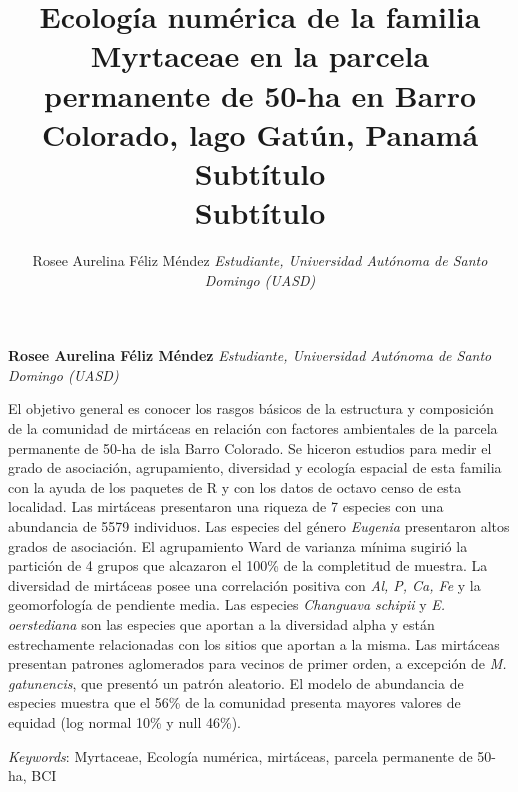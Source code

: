 \documentclass[11pt,]{article}
\title{Ecología numérica de la familia Myrtaceae en la parcela permanente de
50-ha en Barro Colorado, lago Gatún, Panamá\\
Subtítulo\\
Subtítulo  }
\author{\Large Rosee Aurelina Féliz Méndez\vspace{0.05in} \newline\normalsize\emph{Estudiante, Universidad Autónoma de Santo Domingo (UASD)}  }
\date{}
\newcommand*{\authorfont}{\fontfamily{phv}\selectfont}
\renewenvironment{abstract}
 {{%
    \setlength{\leftmargin}{0mm}
    \setlength{\rightmargin}{\leftmargin}%
  }%
  \relax}
 {\endlist}
\begin{document}
	
%

{%
\setlength{\parindent}{0pt}
\thispagestyle{plain}
{\fontsize{18}{20}\selectfont\raggedright 
\maketitle  %

}

{
   \vskip 13.5pt\relax \normalsize\fontsize{11}{12} 
\textbf{\authorfont Rosee Aurelina Féliz Méndez} \hskip 15pt \emph{\small Estudiante, Universidad Autónoma de Santo Domingo (UASD)}   

}

}








\begin{abstract}

    \hbox{\vrule height .2pt width 39.14pc}

    \vskip 8.5pt %

\noindent El objetivo general es conocer los rasgos básicos de la estructura y
composición de la comunidad de mirtáceas en relación con factores
ambientales de la parcela permanente de 50-ha de isla Barro Colorado. Se
hiceron estudios para medir el grado de asociación, agrupamiento,
diversidad y ecología espacial de esta familia con la ayuda de los
paquetes de R y con los datos de octavo censo de esta localidad. Las
mirtáceas presentaron una riqueza de 7 especies con una abundancia de
5579 individuos. Las especies del género \emph{Eugenia} presentaron
altos grados de asociación. El agrupamiento Ward de varianza mínima
sugirió la partición de 4 grupos que alcazaron el 100\% de la
completitud de muestra. La diversidad de mirtáceas posee una correlación
positiva con \emph{Al, P, Ca, Fe} y la geomorfología de pendiente media.
Las especies \emph{Changuava schipii} y \emph{E. oerstediana} son las
especies que aportan a la diversidad alpha y están estrechamente
relacionadas con los sitios que aportan a la misma. Las mirtáceas
presentan patrones aglomerados para vecinos de primer orden, a excepción
de \emph{M. gatunencis}, que presentó un patrón aleatorio. El modelo de
abundancia de especies muestra que el 56\% de la comunidad presenta
mayores valores de equidad (log normal 10\% y null 46\%).


\vskip 8.5pt \noindent \emph{Keywords}: Myrtaceae, Ecología numérica, mirtáceas, parcela permanente de 50-ha,
BCI \par

    \hbox{\vrule height .2pt width 39.14pc}



\end{abstract}
\end{document}
